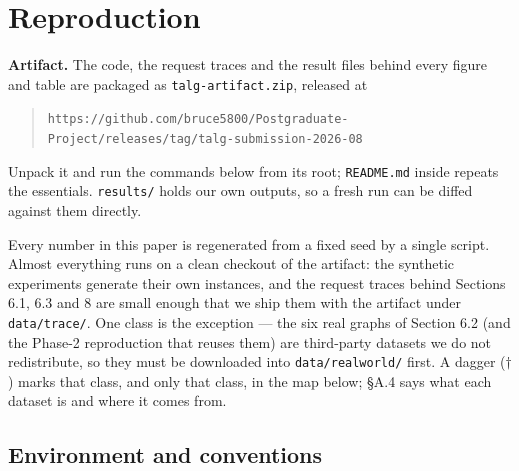 \section{Reproduction}

\textbf{Artifact.} The code, the request traces and the result files
behind every figure and table are packaged as
\texttt{talg-artifact.zip}, released at

\begin{quote}
\texttt{https://github.com/bruce5800/Postgraduate-Project/releases/tag/talg-submission-2026-08}
\end{quote}

Unpack it and run the commands below from its root; \texttt{README.md}
inside repeats the essentials. \texttt{results/} holds our own outputs,
so a fresh run can be diffed against them directly.

Every number in this paper is regenerated from a fixed seed by a single
script. Almost everything runs on a clean checkout of the artifact: the
synthetic experiments generate their own instances, and the request
traces behind Sections 6.1, 6.3 and 8 are small enough that we ship them
with the artifact under \texttt{data/trace/}. One class is the exception
--- the six real graphs of Section 6.2 (and the Phase-2 reproduction
that reuses them) are third-party datasets we do not redistribute, so
they must be downloaded into \texttt{data/realworld/} first. A dagger
(\(\dagger\)) marks that class, and only that class, in the map below;
§A.4 says what each dataset is and where it comes from.

\subsection{Environment and
conventions}

